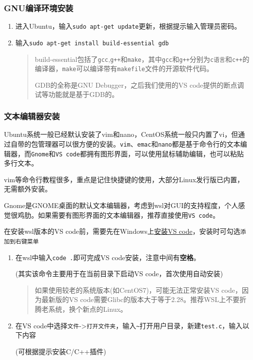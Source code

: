 \documentclass[
]{article}
\begin{document}
\subsubsection{GNU编译环境安装}\label{gnuux7f16ux8bd1ux73afux5883ux5b89ux88c5span-idgnuspan}

\begin{enumerate}
	\def\labelenumi{\arabic{enumi}.}
	\item \label{GNU}
	      进入Ubuntu，输入\texttt{sudo\ apt-get\ update}更新，根据提示输入管理员密码。
	\item
	      输入\texttt{sudo\ apt-get\ install\ build-essential\ gdb}

	      \begin{quote}
		      build-essential包括了\texttt{gcc},\texttt{g++}和\texttt{make}，其中\texttt{gcc}和\texttt{g++}分别为\texttt{c语言}和\texttt{c++}的编译器，\texttt{make}可以编译带有\texttt{makefile}文件的开源软件代码。

		      GDB的全称是GNU Debugger，之后我们使用的VS
		      code提供的断点调试等功能就是基于GDB的。
	      \end{quote}
\end{enumerate}

\subsubsection{文本编辑器安装}\label{ux6587ux672cux7f16ux8f91ux5668ux5b89ux88c5}

Ubuntu系统一般已经默认安装了vim和nano，CentOS系统一般只内置了vi，但通过自带的包管理器可以很方便的安装。\texttt{vim}、\texttt{emac}和\texttt{nano}都是基于命令行的文本编辑器，而\texttt{Gnome}和\texttt{VS\ code}都拥有图形界面，可以使用鼠标辅助编辑，也可以粘贴多行文本。

vim等命令行教程很多，重点是记住快捷键的使用，大部分Linux发行版已内置，无需额外安装。

Gnome是GNOME桌面的默认文本编辑器，考虑到wsl对GUI的支持程度，个人感觉很鸡肋。如果需要有图形界面的文本编辑器，推荐直接使用\texttt{VS\ code}。

在安装wsl版本的VS
code前，需要先在Windows上\href{https://code.visualstudio.com/}{安装VS
	code}，安装时可勾选\texttt{添加到右键菜单}

\begin{enumerate}
	\def\labelenumi{\arabic{enumi}.}
	\item
	      在wsl中输入\texttt{code\ .}即可完成VS
	      code安装，注意中间有\textbf{空格}。

	      (其实该命令主要用于在当前目录下启动VS code，首次使用自动安装)

	      \begin{quote}
		      如果使用较老的系统版本(如CentOS7)，可能无法正常安装VS
		      code，因为最新版的VS
		      code需要Glibc的版本大于等于2.28。推荐WSL上不要折腾老系统，换个新点的Linux。
	      \end{quote}
	\item
	      在VS
	      code中选择\texttt{文件}-\textgreater{}\texttt{打开文件夹}，输入\texttt{\textasciitilde{}}打开用户目录，新建\texttt{test.c}，输入以下内容

	      (可根据提示安装C/C++插件)
\end{enumerate}
\end{document}
